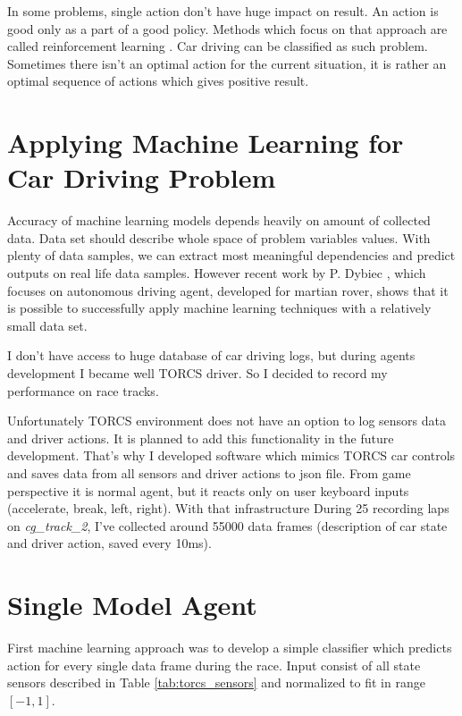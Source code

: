 \documentclass[declaration,shortabstract,english,inz]{iithesis}
\begin{document}
In some problems, single action don't have huge impact on result.
An action is good only as a part of a good policy.
Methods which focus on that approach are called reinforcement learning \cite{Introduction_ML}.
Car driving can be classified as such problem.
Sometimes there isn't an optimal action for the current situation, it is rather an optimal sequence of actions which gives positive result.


\section{Applying Machine Learning for Car Driving Problem}

Accuracy of machine learning models depends heavily on amount of collected data.
Data set should describe whole space of problem variables values.
With plenty of data samples, we can extract most meaningful dependencies and predict outputs on real life data samples.
However recent work by P. Dybiec \cite{rover}, which focuses on autonomous driving agent, developed for martian rover, shows that it is possible to successfully apply machine learning techniques with a relatively small data set.

  
I don't have access to huge database of car driving logs, but during agents development I became well TORCS driver.
So I decided to record my performance on race tracks.

Unfortunately TORCS environment does not have an option to log sensors data and driver actions.
It is planned to add this functionality in the future development.
That's why I developed software which mimics TORCS car controls and saves data from all sensors and driver actions to json file.
From game perspective it is normal agent, but it reacts only on user keyboard inputs (accelerate, break, left, right).
 With that infrastructure During 25 recording laps on \textit{cg\_track\_2}, I've collected around 55000 data frames (description of car state and driver action, saved every 10ms).

\section{Single Model Agent}



First machine learning approach was to develop a simple classifier which predicts action for every single data frame during the race.
Input consist of all state sensors described  in Table \ref{tab:torcs_sensors} and normalized to fit in range $[-1,1]$.
\end{document}
